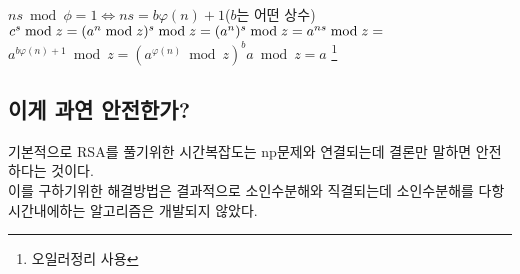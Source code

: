 $ ns\bmod \phi =1 \Longleftrightarrow ns = b\varphi(n)+1$($b$는 어떤 상수)
\newline 
$c^s \bmod z=(a^n \bmod z)^s \bmod z = (a^n)^s \bmod z \newline = a^{ns}\bmod z =$
$a^{b\varphi(n)+1}\bmod z =(a^{\varphi(n)} \bmod z)^{b} a \bmod z =a$ \footnote{오일러정리 사용}

\subsection{이게 과연 안전한가?}
기본적으로 RSA를 풀기위한 시간복잡도는 np문제와 연결되는데 결론만 말하면 안전하다는 것이다. \\
이를 구하기위한 해결방법은 결과적으로 소인수분해와 직결되는데 소인수분해를 다항시간내에하는 알고리즘은 개발되지 않았다.\\

